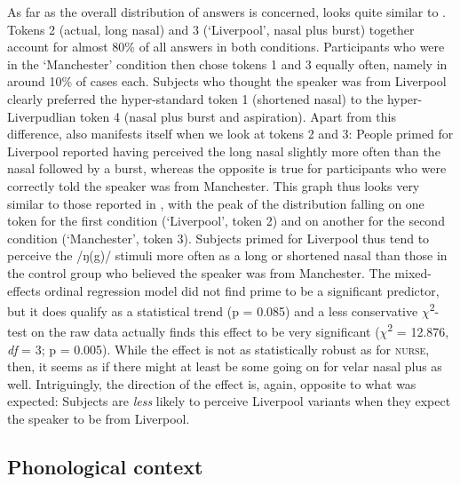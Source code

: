 As far as the overall distribution of answers is concerned,  looks quite similar to .
Tokens 2 (actual, long nasal) and 3 (`Liverpool', nasal plus burst) together account for almost 80\% of all answers in both conditions.
Participants who were in the `Manchester' condition then chose tokens 1 and 3 equally often, namely in around 10\% of cases each.
Subjects who thought the speaker was from Liverpool clearly preferred the hyper-standard token 1 (shortened nasal) to the hyper-Liverpudlian token 4 (nasal plus burst and aspiration).
Apart from this difference,  also manifests itself when we look at tokens 2 and 3: People primed for Liverpool reported having perceived the long nasal slightly more often than the nasal followed by a burst, whereas the opposite is true for participants who were correctly told the speaker was from Manchester.
This graph thus looks very similar to those reported in \citealt{hayetal2006a, haydrager2010}, with the peak of the distribution falling on one token for the first condition (`Liverpool', token 2) and on another for the second condition (`Manchester', token 3).
Subjects primed for Liverpool thus tend to perceive the /ŋ(g)/ stimuli more often as a long or shortened nasal than those in the control group who believed the speaker was from Manchester.
The mixed-effects ordinal regression model did not find prime to be a significant predictor, but it does qualify as a statistical trend (p = 0.085) and a less conservative \(\chi\)\textsuperscript{2}-test on the raw data actually finds this effect to be very significant (\(\chi\)\textsuperscript{2} = 12.876, \emph{df} = 3; p = 0.005).
While the effect is not as statistically robust as for \textsc{nurse}, then, it seems as if there might at least be some  going on for velar nasal plus as well.
Intriguingly, the direction of the effect is, again, opposite to what was expected: Subjects are \emph{less} likely to perceive Liverpool variants when they expect the speaker to be from Liverpool.

\subsection{Phonological context}
\label{sec.perc_res.ng.phon}

